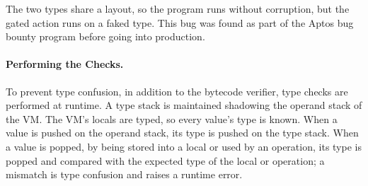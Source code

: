 \noindent The two types share a layout, so the program runs without corruption, but the gated action runs on a faked type.
This bug was found as part of the Aptos bug bounty program before going into production.

\paragraph{Performing the Checks.}
To prevent type confusion, in addition to the bytecode verifier, type checks are performed at runtime.
A type stack is maintained shadowing the operand stack of the VM.
The VM's locals are typed, so every value's type is known. 
When a value is pushed on the operand stack, its type is pushed on the type stack.
When a value is popped, by being stored into a local or used by an operation, its type is popped and compared with the expected type of the local or operation; a mismatch is type confusion and raises a runtime error.






